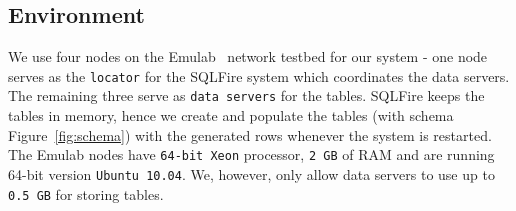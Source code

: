 
\subsection{Environment}
\label{sec:environment}
We use four nodes on the Emulab~\cite{web:emulab} network testbed for our system - one node serves as the \texttt{locator} for the SQLFire system which coordinates the data servers.  The remaining three serve as \texttt{data servers} for the tables.  SQLFire keeps the tables in memory, hence we create and populate the tables (with schema Figure~\ref{fig:schema}) with the generated rows whenever the system is restarted. The Emulab nodes have \texttt{64-bit Xeon} processor, \texttt{2 GB} of RAM and are running 64-bit version \texttt{Ubuntu 10.04}.  We, however, only allow data servers to use up to \texttt{0.5 GB} for storing tables.

